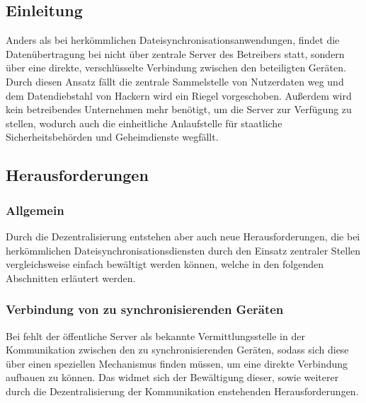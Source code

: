 \subsection{Einleitung}
Anders als bei herkömmlichen Dateisynchronisationsanwendungen, findet die
Datenübertragung bei \sblit nicht über zentrale Server des Betreibers statt,
sondern über eine direkte, verschlüsselte Verbindung zwischen den beteiligten
Geräten.
Durch diesen Ansatz fällt die zentrale Sammelstelle von Nutzerdaten
weg und dem Datendiebstahl von Hackern wird ein Riegel vorgeschoben. Außerdem
wird kein betreibendes Unternehmen mehr benötigt, um die Server zur Verfügung zu
stellen, wodurch auch die einheitliche Anlaufstelle für staatliche Sicherheitsbehörden
und Geheimdienste wegfällt.

\subsection{Herausforderungen}
\subsubsection{Allgemein}
Durch die Dezentralisierung entstehen aber auch neue Herausforderungen, die bei
herkömmlichen Dateisynchronisationsdiensten durch den Einsatz zentraler Stellen
vergleichsweise einfach bewältigt werden können, welche in den folgenden Abschnitten erläutert werden.

\subsubsection{Verbindung von zu synchronisierenden Geräten}
Bei \sblit fehlt der öffentliche Server als bekannte Vermittlungsstelle in der Kommunikation
zwischen den zu synchronisierenden Geräten, sodass sich diese über einen speziellen
Mechanismus finden müssen, um eine direkte Verbindung aufbauen zu können.
Das  widmet sich der Bewältigung dieser, sowie weiterer
durch die Dezentralisierung der Kommunikation enstehenden Herausforderungen.

